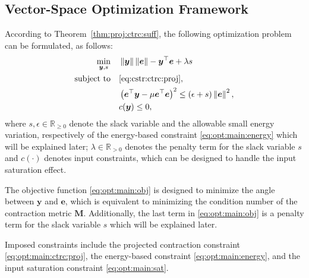 \documentclass{ifacconf}
\newcommand\R{\mathbb{R}}
\newcommand*{\mv}[1]{\boldsymbol{#1}} %
\newcommand*{\mm}[1]{\boldsymbol{#1}} %
\newcommand*{\norm}[1]{\left\lVert #1 \right\rVert} %
\begin{document}
\subsection{Vector-Space Optimization Framework} \label{sec:sub:vector:space:opt}

According to Theorem~\ref{thm:proj:ctrc:suff}, the following optimization problem can be formulated, as follows:
\begin{subequations} \label{eq:opt:main}
   \begin{align}
      \min_{
         \mv{y},s
         } 
         \quad &
      \norm{\mv{y}}\norm{\mv{e}} - \mv{y}^\top \mv{e}
      +
      \lambda s
      \label{eq:opt:main:obj}
      \\
      \text{subject to} 
      \quad &
         \eqref{eq:cstr:ctrc:proj}
         ,
         \label{eq:opt:main:ctrc:proj}
         \\ &
         \left(
            \mv{e}^\top \mv{y} 
            -
            \mu \mv{e}^\top \mv{e}
         \right)^2
         \le
         (\epsilon + s) \norm{\mv{e}}^2
         ,
         \label{eq:opt:main:energy}
         \\ &
         c(\mv{y}) \le 0
         ,
         \label{eq:opt:main:sat}
   \end{align}
\end{subequations}
where $s,\epsilon\in\R_{\ge0}$ denote the slack variable and the allowable small energy variation, respectively of the energy-based constraint \eqref{eq:opt:main:energy} which will be explained later; $\lambda\in\R_{>0}$ denotes the penalty term for the slack variable $s$ and $c(\cdot)$ denotes input constraints, which can be designed to handle the input saturation effect.

The objective function \eqref{eq:opt:main:obj} is designed to minimize the angle between $\mv{y}$ and $\mv{e}$, which is equivalent to minimizing the condition number of the contraction metric $\mm{M}$.
Additionally, the last term in \eqref{eq:opt:main:obj} is a penalty term for the slack variable $s$ which will be explained later.

Imposed constraints include the projected contraction constraint \eqref{eq:opt:main:ctrc:proj}, the energy-based constraint \eqref{eq:opt:main:energy}, and the input saturation constraint \eqref{eq:opt:main:sat}.
\end{document}
